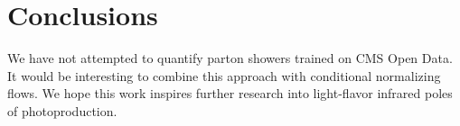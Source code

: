\section{Conclusions}\label{sec:conclusions}

We have not attempted to quantify parton showers trained on CMS Open
Data. It would be interesting to combine this approach with conditional
normalizing flows. We hope this work inspires further research into
light-flavor infrared poles of photoproduction.

